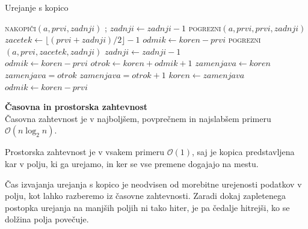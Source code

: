 \documentclass[a4paper,oneside,12pt]{article}
\newcommand{\subsubsubsection}[1]{\vspace*{1ex}\textbf{#1}\\}
\begin{document}
\begin{algorithm}
  \caption{Urejanje s kopico}\label{algo:heapsort}
  \begin{algorithmic}[1]
        \State \textsc{nakopiči}$(a, prvi, zadnji)$
            ;
            \State $zadnji \gets zadnji - 1$
            \State \textsc{pogrezni}$(a, prvi, prvi, zadnji)$
        \EndWhile
    \EndFunction
    \\
        \State $zacetek \gets \lfloor(prvi + zadnji) / 2\rfloor - 1$
         
            \State $odmik \gets koren - prvi$
            \State \textsc{pogrezni}$(a, prvi, zacetek, zadnji)$
            \State $zadnji \gets zadnji - 1$
        \EndWhile
    \EndFunction
    \\
        \State $odmik \gets koren - prvi$
         
            \State $otrok \gets koren + odmik + 1$
            \State $zamenjava \gets koren$ 
             
            \State $zamenjava = otrok$
            \EndIf {}
                \State $zamenjava = otrok + 1$
            \EndIf
                \State $koren \gets zamenjava$
                \State $odmik \gets koren - prvi$
            \Else
                \State \Return 
            \EndIf
        \EndWhile
    \EndFunction
  \end{algorithmic}
\end{algorithm}

\subsubsubsection{Časovna in prostorska zahtevnost}
Časovna zahtevnost je v najboljšem, povprečnem in najslabšem primeru $\mathcal{O}(n\log_2 n)$.

Prostorska zahtevnost je v vsakem primeru $\mathcal{O}(1)$, saj je kopica predstavljena kar v
polju, ki ga urejamo, in ker se vse premene dogajajo na mestu.

Čas izvajanja urejanja s kopico je neodvisen od morebitne urejenosti podatkov v polju,
kot lahko razberemo iz časovne zahtevnosti. Zaradi dokaj zapletenega postopka urejanja
na manjših poljih ni tako hiter, je pa čedalje hitrejši, ko se dolžina polja
povečuje.
\end{document}
